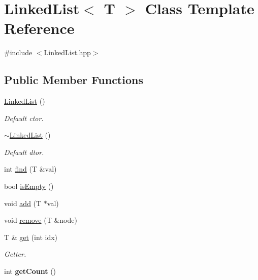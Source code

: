\hypertarget{class_linked_list}{}\section{Linked\+List$<$ T $>$ Class Template Reference}
\label{class_linked_list}


{\ttfamily \#include $<$Linked\+List.\+hpp$>$}

\subsection*{Public Member Functions}
\begin{DoxyCompactItemize}
\item 
\mbox{\label{class_linked_list_a3c20fcfec867e867f541061a09fc640c}} 
\mbox{\hyperlink{class_linked_list_a3c20fcfec867e867f541061a09fc640c}{Linked\+List}} ()
\begin{DoxyCompactList}\small\item\em Default ctor. \end{DoxyCompactList}\item 
\mbox{\label{class_linked_list_a7c37609df3b83bc4eb0281b852f93fd7}} 
\mbox{\hyperlink{class_linked_list_a7c37609df3b83bc4eb0281b852f93fd7}{$\sim$\+Linked\+List}} ()
\begin{DoxyCompactList}\small\item\em Default dtor. \end{DoxyCompactList}\item 
int \mbox{\hyperlink{class_linked_list_a881eb35646625db85ea669cf80681f8f}{find}} (T \&val)
\item 
bool \mbox{\hyperlink{class_linked_list_a7ecbb28e82117a680839ed0dc28ebdce}{is\+Empty}} ()
\item 
void \mbox{\hyperlink{class_linked_list_acf312b61f5d68eac9d4a08c70dbb7276}{add}} (T $\ast$val)
\item 
void \mbox{\hyperlink{class_linked_list_a72cee7f68addc8190e5be9eeb966687c}{remove}} (T \&node)
\item 
\mbox{\label{class_linked_list_ae4026fe9959891270961b33535eb2d36}} 
T \& \mbox{\hyperlink{class_linked_list_ae4026fe9959891270961b33535eb2d36}{get}} (int idx)
\begin{DoxyCompactList}\small\item\em Getter. \end{DoxyCompactList}\item 
\mbox{\label{class_linked_list_ae348947abcce7b58ebdaf94714a5c21c}} 
int {\bfseries get\+Count} ()
\end{DoxyCompactItemize}


